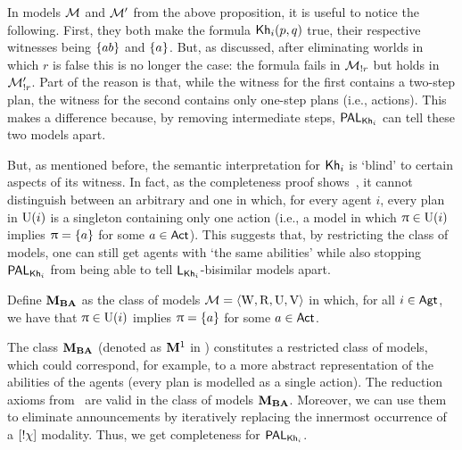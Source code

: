 In models $\mathcal{M}$ and $\mathcal{M}'$ from the above proposition, it is useful to notice the following. First, they both make the formula ${\sf Kh}_i(p,q)$ true, their respective witnesses being $\{ ab \}$ and $\{ a \}$. But, as discussed, after eliminating worlds in which $r$ is false this is no longer the case: the formula fails in $\mathcal{M}_{!r}$ but holds in $\mathcal{M}_{!r}'$. Part of the reason is that, while the witness for the first contains a two-step plan, the witness for the second contains only one-step plans (i.e., actions). This makes a difference because, by removing intermediate steps, $\mathsf{PAL}_{{\sf Kh}_i}$ can tell these two models apart. 

But, as mentioned before, the semantic interpretation for ${\sf Kh}_i$ is `blind' to certain aspects of its witness. In fact, as the completeness proof shows~\cite{AFSVQ21}, it cannot distinguish between an arbitrary \ults and one in which, for every agent $i$, every plan in $\operatorname{U}(i)$ is a singleton containing only one action (i.e., a model in which $\uppi \in \operatorname{U}(i)$ implies $\uppi = \{ a \}$ for some $a \in {\rm \sf Act}$). This suggests that, by restricting the class of models, one can still get agents with `the same abilities' while also stopping $\mathsf{PAL}_{{\sf Kh}_i}$ from being able to tell $\mathsf{L}_{{\sf Kh}_i}$-bisimilar models apart.

\medskip 

\begin{definition}\label{def:class-m-one}
Define $\mathbf{M}_{\mathbf{BA}}$ as the class of models $\mathcal{M} = \langle \operatorname{W}, \operatorname{R}, \operatorname{U}, \operatorname{V} \rangle$ in which, for all $i \in {\rm \sf Agt}$, we have that $\uppi \in \operatorname{U}(i)$ implies $\uppi = \{ a \}$ for some $a \in {\rm \sf Act}$.
\end{definition}

\medskip 

The class $\mathbf{M}_{\mathbf{BA}}$ (denoted as $\mathbf{M}^1$ in \cite{AFSVQ21}) constitutes a restricted class of models, which could correspond, for example, to a more abstract representation of the abilities of the agents (every plan is modelled as a single action). The reduction axioms from~ are valid in the class of models $\mathbf{M}_{\mathbf{BA}}$. Moreover, we can use them to eliminate announcements by iteratively replacing the innermost occurrence of a $[!\chi]$ modality. Thus, we get completeness for $\mathsf{PAL}_{{\sf Kh}_i}$.

